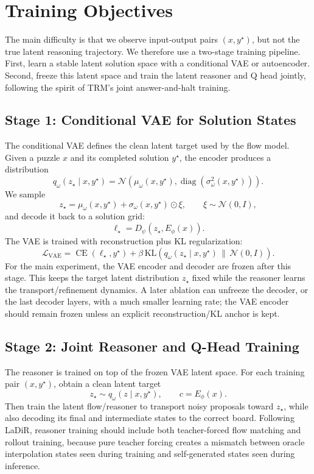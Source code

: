 \documentclass[11pt]{article}
\begin{document}
\section{Training Objectives}

The main difficulty is that we observe input-output pairs \((x,y^\star)\), but not the true latent reasoning trajectory. We therefore use a two-stage training pipeline. First, learn a stable latent solution space with a conditional VAE or autoencoder. Second, freeze this latent space and train the latent reasoner and Q head jointly, following the spirit of TRM's joint answer-and-halt training.

\subsection{Stage 1: Conditional VAE for Solution States}

The conditional VAE defines the clean latent target used by the flow model. Given a puzzle \(x\) and its completed solution \(y^\star\), the encoder produces a distribution
\[
    q_\omega(z_\star\mid x,y^\star)
    =
    \mathcal N(\mu_\omega(x,y^\star),\operatorname{diag}(\sigma_\omega^2(x,y^\star))).
\]
We sample
\[
    z_\star
    =
    \mu_\omega(x,y^\star)
    +
    \sigma_\omega(x,y^\star)\odot\xi,
    \qquad
    \xi\sim\mathcal N(0,I),
\]
and decode it back to a solution grid:
\[
    \ell_\star = D_\psi(z_\star,E_\phi(x)).
\]
The VAE is trained with reconstruction plus KL regularization:
\[
    \mathcal L_{\mathrm{VAE}}
    =
    \operatorname{CE}(\ell_\star,y^\star)
    +
    \beta\,
    \mathrm{KL}
    \left(
        q_\omega(z_\star\mid x,y^\star)
        \,\|\,\mathcal N(0,I)
    \right).
\]
For the main experiment, the VAE encoder and decoder are frozen after this stage. This keeps the target latent distribution \(z_\star\) fixed while the reasoner learns the transport/refinement dynamics. A later ablation can unfreeze the decoder, or the last decoder layers, with a much smaller learning rate; the VAE encoder should remain frozen unless an explicit reconstruction/KL anchor is kept.

\subsection{Stage 2: Joint Reasoner and Q-Head Training}

The reasoner is trained on top of the frozen VAE latent space. For each training pair \((x,y^\star)\), obtain a clean latent target
\[
    z_\star\sim q_\omega(z\mid x,y^\star),
    \qquad
    c=E_\phi(x).
\]
Then train the latent flow/reasoner to transport noisy proposals toward \(z_\star\), while also decoding its final and intermediate states to the correct board. Following LaDiR, reasoner training should include both teacher-forced flow matching and rollout training, because pure teacher forcing creates a mismatch between oracle interpolation states seen during training and self-generated states seen during inference.
\end{document}
